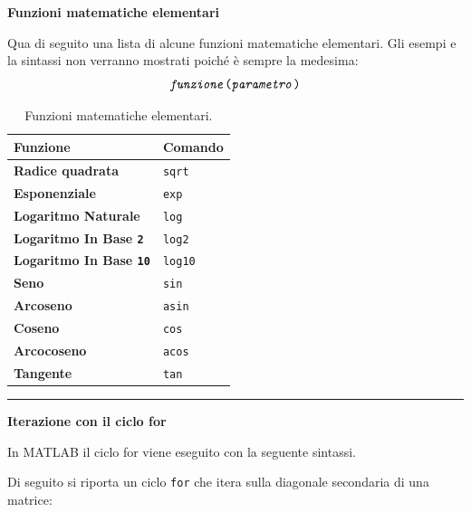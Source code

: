 \documentclass[a4paper]{article}
\newcommand{\longline}{\noindent\rule{\textwidth}{0.4pt}}
\begin{document}
    \begin{flushleft}
        \large
        \hypertarget{
            lab: Funzioni matematiche elementari
        }{
            \textcolor{Red3}{\textbf{Funzioni matematiche elementari}}
        }
        \label{lab: Funzioni matematiche elementari}
    \end{flushleft}
    Qua di seguito una lista di alcune funzioni matematiche elementari. Gli esempi e la sintassi non verranno mostrati poiché è sempre la medesima:
    \begin{equation*}
        \texttt{\emph{funzione}(\emph{parametro})}
    \end{equation*}
    \begin{table}[!htp]
        \centering
        \begin{tabular}{@{} l l @{}}
            \toprule
            \textbf{Funzione} & \textbf{Comando} \\
            \midrule
            \textbf{Radice quadrata}                & \texttt{sqrt} \\
            \textbf{Esponenziale}                   & \texttt{exp} \\
            \textbf{Logaritmo Naturale}             & \texttt{log} \\
            \textbf{Logaritmo In Base \texttt{2}}   & \texttt{log2} \\
            \textbf{Logaritmo In Base \texttt{10}}  & \texttt{log10} \\
            \textbf{Seno}                           & \texttt{sin} \\
            \textbf{Arcoseno}                       & \texttt{asin} \\
            \textbf{Coseno}                         & \texttt{cos} \\
            \textbf{Arcocoseno}                     & \texttt{acos} \\
            \textbf{Tangente}                       & \texttt{tan} \\
            \bottomrule
        \end{tabular}
        \caption{Funzioni matematiche elementari.}
    \end{table}

    \longline

    \begin{flushleft}
        \large
        \textcolor{Red3}{\textbf{Iterazione con il ciclo for}}
    \end{flushleft}
    In MATLAB il ciclo for viene eseguito con la seguente sintassi.
    
    Di seguito si riporta un ciclo \texttt{for} che itera sulla diagonale secondaria di una matrice:
    
\end{document}
